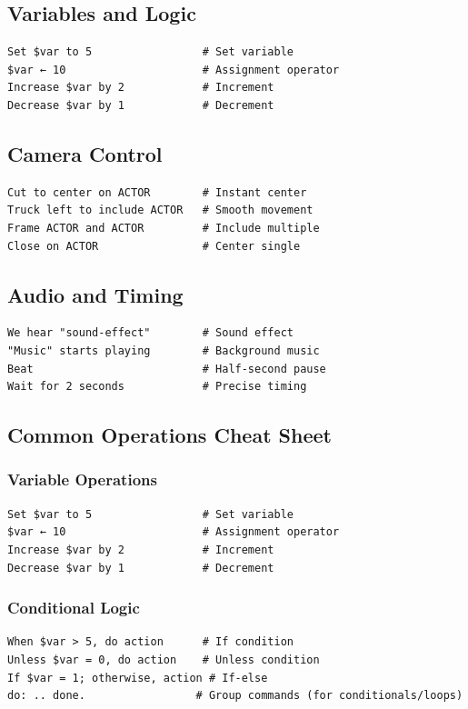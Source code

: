 \documentclass[11pt,letterpaper,oldstylefigures]{memoir}
\begin{document}
\subsection{Variables and Logic}
\label{sec:variables-and-logic}
\begin{verbatim}
Set $var to 5                 # Set variable
$var ← 10                     # Assignment operator
Increase $var by 2            # Increment
Decrease $var by 1            # Decrement
\end{verbatim}

\subsection{Camera Control}
\begin{verbatim}
Cut to center on ACTOR        # Instant center
Truck left to include ACTOR   # Smooth movement
Frame ACTOR and ACTOR         # Include multiple
Close on ACTOR                # Center single
\end{verbatim}

\subsection{Audio and Timing}
\begin{verbatim}
We hear "sound-effect"        # Sound effect
"Music" starts playing        # Background music
Beat                          # Half-second pause
Wait for 2 seconds            # Precise timing
\end{verbatim}

\subsection{Common Operations Cheat Sheet}

\subsubsection{Variable Operations}
\begin{verbatim}
Set $var to 5                 # Set variable
$var ← 10                     # Assignment operator
Increase $var by 2            # Increment
Decrease $var by 1            # Decrement
\end{verbatim}

\subsubsection{Conditional Logic}
\label{sec:conditional-logic}
\begin{verbatim}
When $var > 5, do action      # If condition
Unless $var = 0, do action    # Unless condition
If $var = 1; otherwise, action # If-else
do: .. done.                 # Group commands (for conditionals/loops)
\end{verbatim}
\end{document}
